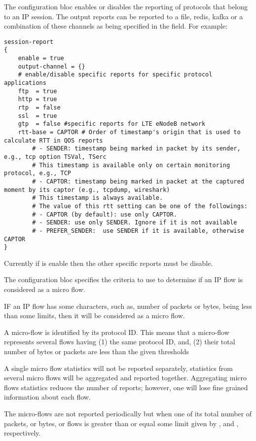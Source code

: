 The configuration bloc enables or disables the reporting of protocols that belong to an IP session. 
The output reports can be reported to a file, redis, kafka or a combination of these channels as being specified in the   field. 
For example:

\begin{lstlisting}[style=CONFIG]
session-report
{ 
    enable = true
    output-channel = {}  
    # enable/disable specific reports for specific protocol applications
    ftp  = true
    http = true
    rtp  = false
    ssl  = true
    gtp  = false #specific reports for LTE eNodeB network
    rtt-base = CAPTOR # Order of timestamp's origin that is used to calculate RTT in QOS reports
        # - SENDER: timestamp being marked in packet by its sender, e.g., tcp option TSVal, TSerc
        # This timestamp is available only on certain monitoring protocol, e.g., TCP
        # - CAPTOR: timestamp being marked in packet at the captured moment by its captor (e.g., tcpdump, wireshark)
        # This timestamp is always available.
        # The value of this rtt setting can be one of the followings:
        # - CAPTOR (by default): use only CAPTOR.
        # - SENDER: use only SENDER. Ignore if it is not available
        # - PREFER_SENDER:  use SENDER if it is available, otherwise CAPTOR
}
\end{lstlisting}

\note Currently if  is enable then the other specific reports must be disable.

The  configuration bloc specifies the criteria to use to determine if an IP flow is considered as a micro flow. 

IF an IP flow has some characters, such as, number of packets or bytes, being less than some limits,
 then it will be considered as a micro flow.

A micro-flow is identified by its protocol ID. 
This means that a micro-flow represents several flows having (1) the same protocol ID, and,
(2) their total number of bytes or packets are less than the given thresholds

A single micro flow statistics will not be reported separately, statistics from several micro flows will be aggregated and reported together. 
Aggregating micro flows statistics reduces the number of reports; however, one will lose fine grained information about each flow. 

The micro-flows are not reported periodically but when one of its total number of packets, or bytes, or flows is greater than or equal some limit
given by ,  and ,  respectively.

